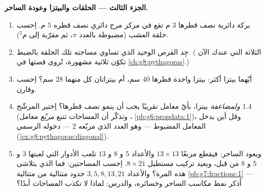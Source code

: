 \begin{problem}[{مسألة نهاية الأسبوع --- «برهان» مشهور على أن
$64 = 65$، تفضحه المساحات والميول، مع بيتزا وحلقات
للحلوى}]
\medskip
\noindent\textbf{الجزء الثالث --- الحلقات والبيتزا وعودة
الساحر.}
\begin{enumerate}[resume]
  \item بركة دائرية نصف قطرها $3$ م تقع في مركز
        مرج دائري نصف قطره $5$ م. اِحسب 
        حلقة العشب (مضبوطة بالعدد $\pi$، ثم مقرّبة إلى
        م$^2$).
  \item جِد  القرص الوحيد الذي تساوي مساحته
         تلك الحلقة بالضبط. ( الثلاثة التي عندك الآن
        تكوّن ثلاثية مشهورة، تُروى قصتها في
        \cref{ch:g8:pythagoras}.)
  \item أيّهما بيتزا أكثر: بيتزا واحدة قطرها $40$ سم، أم
        بيتزاتان  كل منهما $28$ سم؟ اِحسب وقارن.
  \item \emph{ولمضاعفة}  بيتزا، بأيّ معامل تقريبًا
        يجب أن ينمو نصف قطرها؟ اِختبر المرشّح $1.4$ (وتذكّر
        أن المساحات تتبع \emph{مربّع} معامل
        ، \cref{pb:g6:propdata:1})، وقل أين يدخل
        المعامل المضبوط --- وهو العدد الذي مربّعه $2$ ---
        دخوله الرسمي
        (\cref{ex:g8:pythagoras:diagonal}).
  \item ويعود الساحر: فيقطع مربعًا $13 \times 13$
        والأعداد $5$ و $8$ و $13$ تلعب الأدوار التي لعبتها
        $3$ و $5$ و $8$ من قبل، ويعيد تركيب
        مستطيل $8 \times 21$. اِحسب المساحتين: فما الذي
        يتلاشى هذه المرة؟ والأعداد $3, 5, 8, 13, 21$
        حدود متتالية من متتالية
        \cref{pb:g7:fractions:1} --- اُذكر نمط
        مكاسب الساحر وخسائره، والدرس: لماذا لا تكذب المساحات
        أبدًا؟
\end{enumerate}
\end{problem}

